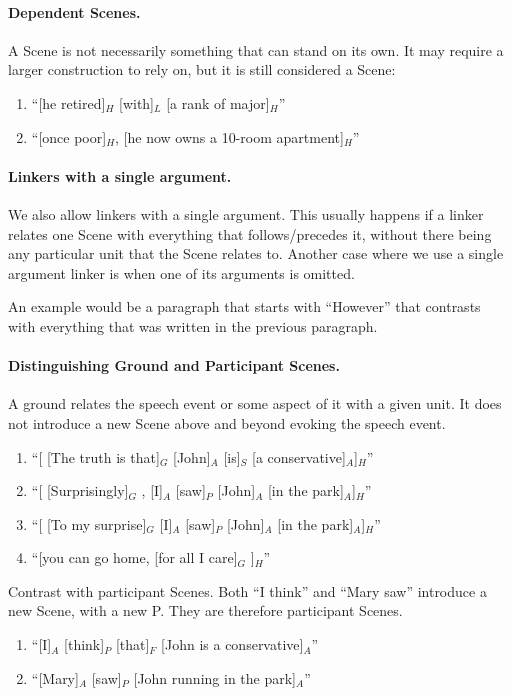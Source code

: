 \documentclass[11pt]{article}
\newcommand{\be}{\begin{enumerate}}
\newcommand{\ee}{\end{enumerate}}
\begin{document}
\paragraph{Dependent Scenes.}
A Scene is not necessarily something that can stand on its own. It may require
a larger construction to rely on, but it is still considered a Scene:
\be
\item
``[he retired]$_H$ [with]$_L$ [a rank of major]$_H$''
\item
``[once poor]$_H$, [he now owns a 10-room apartment]$_H$''
\ee

\paragraph{Linkers with a single argument.}
We also allow linkers with a single argument. This usually happens if a linker relates one Scene with everything that follows/precedes it, without there being any particular unit that the Scene relates to. Another case where we use a single argument linker is when one of its arguments is omitted.

An example would be a paragraph that starts with ``However'' that contrasts with everything that was written in the previous paragraph.

\paragraph{Distinguishing Ground and Participant Scenes.}
A ground relates the speech event or some aspect of it with a given unit. It does not introduce a new Scene above and beyond evoking the speech event.
\be
\item
``[ [The truth is that]$_G$ [John]$_A$ [is]$_S$ [a conservative]$_A$]$_H$''
\item
``[ [Surprisingly]$_G$ , [I]$_A$ [saw]$_P$ [John]$_A$ [in the park]$_A$]$_H$''
\item
``[ [To my surprise]$_G$ [I]$_A$ [saw]$_P$ [John]$_A$ [in the park]$_A$]$_H$''
\item
``[you can go home, [for all I care]$_G$ ]$_H$''
\ee
Contrast with participant Scenes. Both ``I think'' and ``Mary saw'' introduce a new Scene, with a new P. They are therefore participant Scenes.
\be \item
``[I]$_A$ [think]$_P$ [that]$_F$ [John is a conservative]$_A$''
\item
``[Mary]$_A$ [saw]$_P$ [John running in the park]$_A$''
\ee
\end{document}
